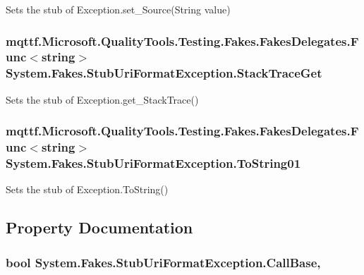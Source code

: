 Sets the stub of Exception.\-set\-\_\-\-Source(\-String value)

\hypertarget{class_system_1_1_fakes_1_1_stub_uri_format_exception_a604cd2577c811439ad3debe9f971bcad}{
\subsubsection[{Stack\-Trace\-Get}]{\setlength{\rightskip}{0pt plus 5cm}mqttf.\-Microsoft.\-Quality\-Tools.\-Testing.\-Fakes.\-Fakes\-Delegates.\-Func$<$string$>$ System.\-Fakes.\-Stub\-Uri\-Format\-Exception.\-Stack\-Trace\-Get}}\label{class_system_1_1_fakes_1_1_stub_uri_format_exception_a604cd2577c811439ad3debe9f971bcad}


Sets the stub of Exception.\-get\-\_\-\-Stack\-Trace()

\hypertarget{class_system_1_1_fakes_1_1_stub_uri_format_exception_acb57f2abc68f8d580c9dc0cb592d912b}{
\subsubsection[{To\-String01}]{\setlength{\rightskip}{0pt plus 5cm}mqttf.\-Microsoft.\-Quality\-Tools.\-Testing.\-Fakes.\-Fakes\-Delegates.\-Func$<$string$>$ System.\-Fakes.\-Stub\-Uri\-Format\-Exception.\-To\-String01}}\label{class_system_1_1_fakes_1_1_stub_uri_format_exception_acb57f2abc68f8d580c9dc0cb592d912b}


Sets the stub of Exception.\-To\-String()



\subsection{Property Documentation}
\hypertarget{class_system_1_1_fakes_1_1_stub_uri_format_exception_a462c15350876988bec6a3a1dd3828f75}{
\subsubsection[{Call\-Base}]{\setlength{\rightskip}{0pt plus 5cm}bool System.\-Fakes.\-Stub\-Uri\-Format\-Exception.\-Call\-Base\hspace{0.3cm}{\ttfamily [get]}, {\ttfamily [set]}}}\label{class_system_1_1_fakes_1_1_stub_uri_format_exception_a462c15350876988bec6a3a1dd3828f75}


